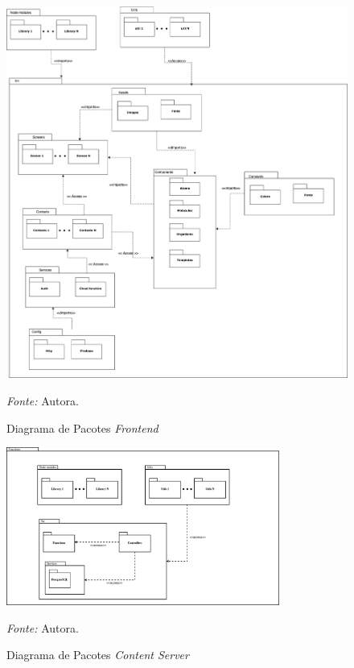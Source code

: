 \begin{figure}[h]
	\centering
	\caption{Diagrama de Pacotes \textit{Frontend}}
	\begin{adjustbox}{center}
		\includegraphics[width=1\textwidth]{figuras/frontend.eps}
	\end{adjustbox}
	\begin{tablenotes}[flushleft]
		\centering
		\item \textit{Fonte:} Autora.
	\end{tablenotes}
	\label{fig09}
\end{figure}

\pagebreak

\begin{figure}[h!]
	\centering
	\caption{Diagrama de Pacotes \textit{Content Server}}
	\begin{adjustbox}{center}
		\includegraphics[width=0.8\textwidth]{figuras/content.eps}
	\end{adjustbox}
	\begin{tablenotes}[flushleft]
		\centering
		\item \textit{Fonte:} Autora.
	\end{tablenotes}
	\label{fig08}
\end{figure}

